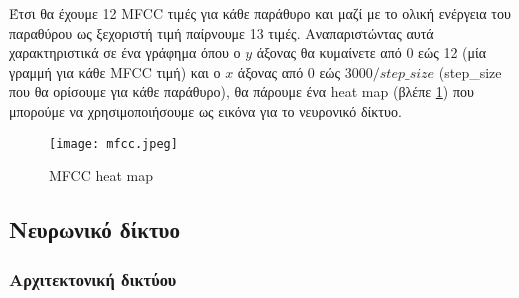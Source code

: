 Έτσι θα έχουμε 12 MFCC τιμές για κάθε παράθυρο και μαζί με το ολική ενέργεια
του παραθύρου ως ξεχοριστή τιμή παίρνουμε 13 τιμές. Αναπαριστώντας αυτά
χαρακτηριστικά σε ένα γράφημα όπου ο $y$ άξονας θα κυμαίνετε από 0 εώς 12 (μία
γραμμή για κάθε MFCC τιμή) και ο $x$ άξονας από 0 εώς $3000 / step\_size$
(step\_size που θα ορίσουμε για κάθε παράθυρο), θα πάρουμε ένα heat map (βλέπε
\ref{mfcc}) που μπορούμε να χρησιμοποιήσουμε ως εικόνα για το νευρονικό δίκτυο.

\begin{figure}[H]
  \center
	\texttt{[image: mfcc.jpeg]}
	\caption{MFCC heat map}
	\label{mfcc}
\end{figure}

\subsection{Νευρωνικό δίκτυο}
\subsubsection{Αρχιτεκτονική δικτύου}
